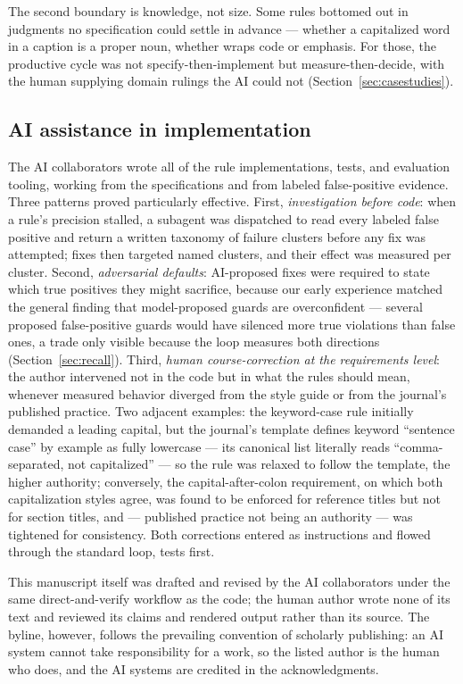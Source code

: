 \documentclass[nojss,article]{jss}
\begin{document}
The second boundary is knowledge, not size. Some rules bottomed out
in judgments no specification could settle in advance --- whether a
capitalized word in a caption is a proper noun, whether
 wraps code or emphasis. For those, the
productive cycle was not specify-then-implement but
measure-then-decide, with the human supplying domain rulings the AI
could not (Section~\ref{sec:casestudies}).

\subsection{AI assistance in implementation}
\label{sec:ai}

The AI collaborators wrote all of the rule implementations, tests,
and evaluation tooling, working from the specifications and from
labeled false-positive evidence. Three patterns proved particularly
effective. First, \emph{investigation before code}: when
a rule's precision stalled, a subagent was dispatched to read every
labeled false positive and return a written taxonomy of failure
clusters before any fix was attempted; fixes then targeted named
clusters, and their effect was measured per cluster. Second,
\emph{adversarial defaults}: AI-proposed fixes were required to state
which true positives they might sacrifice, because our early
experience matched the general finding that model-proposed guards are
overconfident --- several proposed false-positive guards would have
silenced more true violations than false ones, a trade only visible
because the loop measures both directions
(Section~\ref{sec:recall}). Third, \emph{human course-correction at
the requirements level}: the author intervened not in the code but
in what the rules should mean, whenever measured behavior diverged
from the style guide or from the journal's published practice. Two
adjacent examples: the keyword-case rule initially demanded a
leading capital, but the journal's template defines keyword
``sentence case'' by example as fully lowercase --- its canonical
list literally reads ``comma-separated, not capitalized'' --- so
the rule was relaxed to follow the template, the higher authority;
conversely, the capital-after-colon requirement, on which both
capitalization styles agree, was found to be enforced for reference
titles but not for section titles, and --- published practice not
being an authority --- was tightened for consistency. Both
corrections entered as instructions and flowed through the standard
loop, tests first.

This manuscript itself was drafted and revised by the AI
collaborators under the same direct-and-verify workflow as the code;
the human author wrote none of its text and reviewed its claims and
rendered output rather than its source. The byline, however, follows
the prevailing convention of scholarly publishing: an AI system
cannot take responsibility for a work, so the listed author is the
human who does, and the AI systems are credited in the
acknowledgments.
\end{document}
